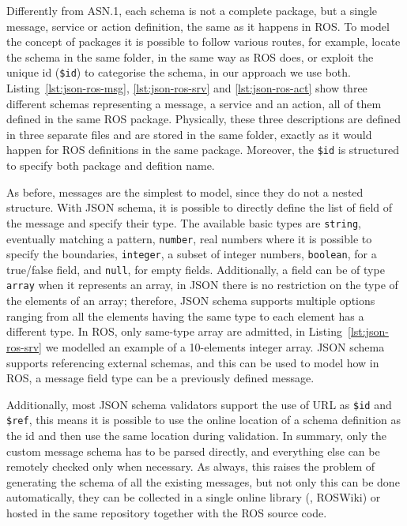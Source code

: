 Differently from ASN.1, each schema is not a complete package, but a single message, service or action definition, the same as it happens in ROS. To model the concept of packages it is possible to follow various routes, for example, locate the schema in the same folder, in the same way as ROS does, or exploit the unique id (\texttt{\$id}) to categorise the schema, in our approach we use both. Listing~\ref{lst:json-ros-msg}, \ref{lst:json-ros-srv} and \ref{lst:json-ros-act} show three different schemas representing a message, a service and an action, all of them defined in the same ROS package. Physically, these three descriptions are defined in three separate files and are stored in the same folder, exactly as it would happen for ROS definitions in the same package. Moreover, the \texttt{\$id} is structured to specify both package and defition name.

As before, messages are the simplest to model, since they do not a nested structure. With JSON schema, it is possible to directly define the list of field of the message and specify their type. The available basic types are \texttt{string}, eventually matching a pattern, \texttt{number}, real numbers where it is possible to specify the boundaries, \texttt{integer}, a subset of integer numbers, \texttt{boolean}, for a true/false field, and \texttt{null}, for empty fields. Additionally, a field can be of type \texttt{array} when it represents an array, in JSON there is no restriction on the type of the elements of an array; therefore, JSON schema supports multiple options ranging from all the elements having the same type to each element has a different type. In ROS, only same-type array are admitted, in Listing~\ref{lst:json-ros-srv} we modelled an example of a 10-elements integer array. JSON schema supports referencing external schemas, and this can be used to model how in ROS, a message field type can be a previously defined message.

Additionally, most JSON schema validators support the use of URL as \texttt{\$id} and \texttt{\$ref}, this means it is possible to use the online location of a schema definition as the id and then use the same location during validation. In summary, only the custom message schema has to be parsed directly, and everything else can be remotely checked only when necessary. As always, this raises the problem of generating the schema of all the existing messages, but not only this can be done automatically, they can be collected in a single online library (\eg, ROSWiki) or hosted in the same repository together with the ROS source code. 

